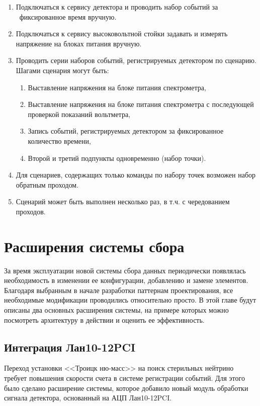 \documentclass[a4paper,14pt]{extreport}
\begin{document}
\begin{enumerate}
    \item Подключаться к сервису детектора и проводить набор событий за \ фиксированное время вручную.
    \item Подключаться к сервису высоковольтной стойки задавать и измерять напряжение на блоках питания вручную.
    \item Проводить серии наборов событий, регистрируемых детектором по сценарию. Шагами сценария могут быть:
    \begin{enumerate}
        \item Выставление напряжения на блоке питания спектрометра,
        \item Выставление напряжения на блоке питания спектрометра с последующей проверкой показаний вольтметра,
        \item Запись событий, регистрируемых детектором за фиксированное количество времени,
        \item Второй и третий подпункты одновременно (набор точки).
    \end{enumerate}
    \item Для сценариев, содержащих только команды по набору точек возможен набор обратным проходом.
    \item Сценарий может быть выполнен несколько раз, в т.ч. с чередованием проходов.
\end{enumerate}

\chapter{Расширения системы сбора}
За время эксплуатации новой системы сбора данных периодически появлялась необходимость в изменении ее конфигурации, добавлению и замене элементов. Благодаря выбранным в начале разработки паттернам проектирования, все необходимые модификации проводились относительно просто. В этой главе будут описаны два основных расширения системы, на примере которых можно посмотреть архитектуру в действии и оценить ее эффективность.

\section{Интеграция Лан10-12PCI}\label{lan10-integration}
Переход установки <<Троицк ню-масс>> на поиск стерильных нейтрино требует повышения скорости счета в системе регистрации событий. Для этого было сделано расширение системы, которое добавило новый модуль обработки сигнала детектора, основанный на АЦП Лан10-12PCI.
\end{document}
